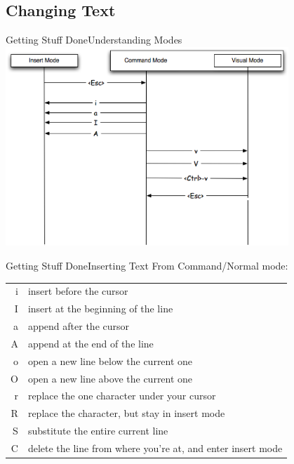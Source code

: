 \documentclass{beamer}
\begin{document}
\subsection{Changing Text}
\begin{frame}[c]{Getting Stuff Done}{Understanding Modes}
    \centering
    \includegraphics[width=0.8\textwidth]{modes}
\end{frame}


\begin{frame}[c]{Getting Stuff Done}{Inserting Text}
    From Command/Normal mode:
    \begin{table}[htpb]
        \centering
        \begin{tabular}{r|l}
            i & insert before the cursor \\
            I & insert at the beginning of the line \\
            a & append after the cursor \\
            A & append at the end of the line \\
            o & open a new line below the current one \\
            O & open a new line above the current one \\
            r & replace the one character under your cursor \\
            R & replace the character, but stay in insert mode \\
            S & substitute the entire current line \\
            C & delete the line from where you're at, and enter insert mode \\
        \end{tabular}
    \end{table}
\end{frame}
\end{document}
